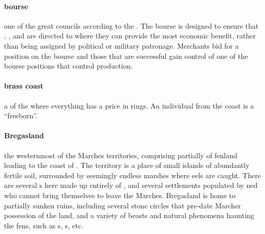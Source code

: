 \paragraph{bourse} one of the great councils according to the . The bourse is designed to ensure that , ,  and  are directed to where they can provide the most economic benefit, rather than being assigned by political or military patronage. Merchants bid for a position on the bourse and those that are successful gain control of one of the bourse positions that control production.
\paragraph{brass coast} a  of the  where everything has a price in rings. An individual from the coast is a “freeborn”.
\paragraph{Bregasland} the westernmost of the Marches territories, comprising partially of fenland leading to the coast of . The territory is a place of small islands of abundantly fertile soil, surrounded by seemingly endless marshes where eels are caught. There are several s here made up entirely of , and several settlements populated by ned who cannot bring themselves to leave the Marches. Bregasland is home to partially sunken ruins, including several stone circles that pre-date Marcher possession of the land, and a variety of beasts and natural phenomena haunting the fens, such as s, s, etc.
